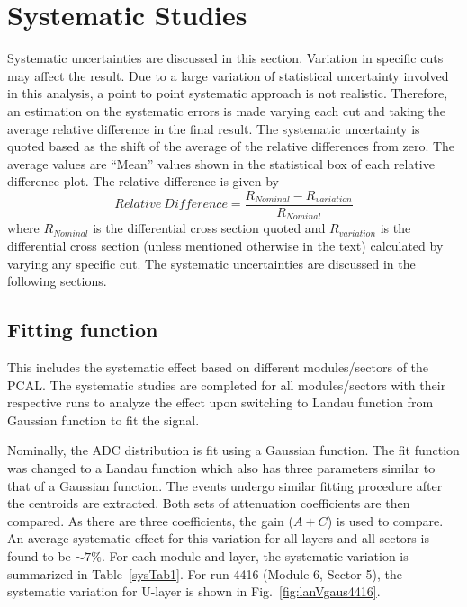 \section{Systematic Studies}
Systematic uncertainties are discussed in this section. 
Variation in specific cuts may affect the result. Due to a
large variation of statistical uncertainty involved in this analysis, 
a point to point systematic approach is not realistic. Therefore, 
an estimation on the systematic errors is made varying each cut 
and taking the average relative difference in the final result. 
The systematic uncertainty is quoted based as the shift of the 
average of the relative differences from zero. The average values
are ``Mean'' values shown in the statistical box of each relative difference plot.
The relative difference is given by
\begin{equation}
 Relative~Difference = \frac{R_{Nominal} - R_{variation}}{R_{Nominal}}
\end{equation}
where $R_{Nominal}$ is the differential cross section quoted and $R_{variation}$ 
is the differential cross section (unless mentioned otherwise in the text) 
calculated by varying any specific cut. The systematic uncertainties 
are discussed in the following sections.

\subsection{Fitting function}
\label{Sec:SysSecDep}
This includes the systematic effect based on different modules/sectors of the PCAL. The systematic
studies are completed for all modules/sectors with their respective runs to analyze the effect
upon switching to Landau function from Gaussian function to fit the signal.

Nominally, the ADC distribution is fit using a Gaussian function. The fit function was changed to
a Landau function which also has three parameters similar to that of a Gaussian function. The events
undergo similar fitting procedure after the centroids are extracted. Both sets of attenuation coefficients
are then compared. As there are three coefficients, the gain ($A+C$) is used to compare. An average systematic effect for this variation for all layers and all sectors is found to
be $\sim7\%$. For each module and layer, the systematic variation is summarized in Table~\ref{sysTab1}.
For run 4416 (Module 6, Sector 5), the systematic variation for U-layer is shown in Fig.~\ref{fig:lanVgaus4416}.

